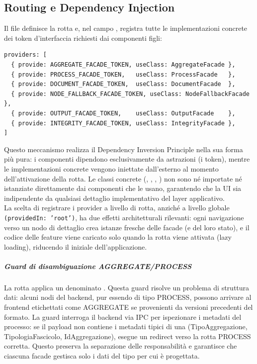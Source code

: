 \subsection{Routing e Dependency Injection}
Il file  definisce la rotta  e, nel campo , registra tutte le implementazioni concrete dei token d'interfaccia richiesti dai componenti figli:
\begin{verbatim}
providers: [
  { provide: AGGREGATE_FACADE_TOKEN, useClass: AggregateFacade },
  { provide: PROCESS_FACADE_TOKEN,   useClass: ProcessFacade   },
  { provide: DOCUMENT_FACADE_TOKEN,  useClass: DocumentFacade  },
  { provide: NODE_FALLBACK_FACADE_TOKEN, useClass: NodeFallbackFacade },
  { provide: OUTPUT_FACADE_TOKEN,    useClass: OutputFacade    },
  { provide: INTEGRITY_FACADE_TOKEN, useClass: IntegrityFacade },
]
\end{verbatim}
Questo meccanismo realizza il Dependency Inversion Principle nella sua forma più pura: i componenti dipendono esclusivamente da astrazioni (i token), mentre le implementazioni concrete vengono iniettate dall'esterno al momento dell'attivazione della rotta. Le classi concrete (, , , ) non sono né importate né istanziate direttamente dai componenti che le usano, garantendo che la UI sia indipendente da qualsiasi dettaglio implementativo del layer applicativo.\\
La scelta di registrare i provider a livello di rotta, anziché a livello globale \texttt{(providedIn: 'root')}, ha due effetti architetturali rilevanti: ogni navigazione verso un nodo di dettaglio crea istanze fresche delle facade (e del loro stato), e il codice delle feature viene caricato solo quando la rotta viene attivata (lazy loading), riducendo il  iniziale dell'applicazione.
\subparagraph{Guard di disambiguazione AGGREGATE/PROCESS}
La rotta applica un  denominato . Questa guard risolve un problema di struttura dati: alcuni nodi del backend, pur essendo di tipo PROCESS, possono arrivare al frontend etichettati come AGGREGATE se provenienti da versioni precedenti del formato. La guard interroga il backend via IPC per ispezionare i metadati del processo: se il payload non contiene i metadati tipici di una  (TipoAggregazione, TipologiaFascicolo, IdAggregazione), esegue un redirect verso la rotta PROCESS corretta. Questo preserva la separazione delle responsabilità e garantisce che ciascuna facade gestisca solo i dati del tipo per cui è progettata.

